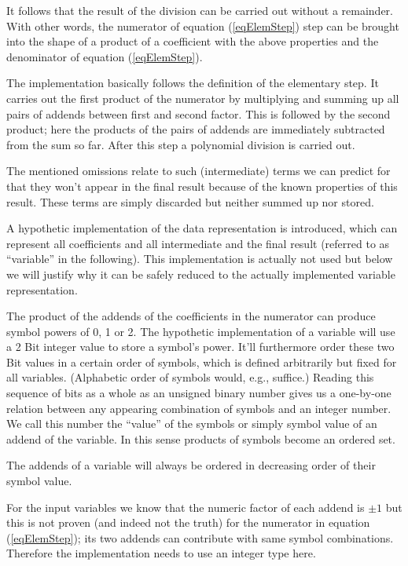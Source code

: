 It follows that the result of the division can be carried out without a
remainder. With other words, the numerator of equation (\ref{eqElemStep})
step can be brought into the shape of a product of a coefficient with the
above properties and the denominator of equation (\ref{eqElemStep}).

The implementation basically follows the definition of the elementary
step. It carries out the first product of the numerator by multiplying and
summing up all pairs of addends between first and second factor. This is
followed by the second product; here the products of the pairs of addends
are immediately subtracted from the sum so far. After this step a
polynomial division is carried out.

The mentioned omissions relate to such (intermediate) terms we can predict
for that they won't appear in the final result because of the known
properties of this result. These terms are simply discarded but neither
summed up nor stored.

A hypothetic implementation of the data representation is introduced,
which can represent all coefficients and all intermediate and the final
result (referred to as ``variable'' in the following). This implementation
is actually not used but below we will justify why it can be safely
reduced to the actually implemented variable representation.

The product of the addends of the coefficients in the numerator can
produce symbol powers of 0, 1 or 2. The hypothetic implementation of a
variable will use a 2 Bit integer value to store a symbol's power. It'll
furthermore order these two Bit values in a certain order of symbols,
which is defined arbitrarily but fixed for all variables. (Alphabetic
order of symbols would, e.g., suffice.) Reading this sequence of bits as a
whole as an unsigned binary number gives us a one-by-one relation between
any appearing combination of symbols and an integer number. We call this
number the ``value'' of the symbols or simply symbol value of an addend of
the variable. In this sense products of symbols become an ordered set.

The addends of a variable will always be ordered in decreasing order of
their symbol value.

For the input variables we know that the numeric factor of each addend is
$\pm 1$ but this is not proven (and indeed not the truth) for the
numerator in equation (\ref{eqElemStep}); its two addends can contribute
with same symbol combinations. Therefore the implementation needs to use
an integer type here.


